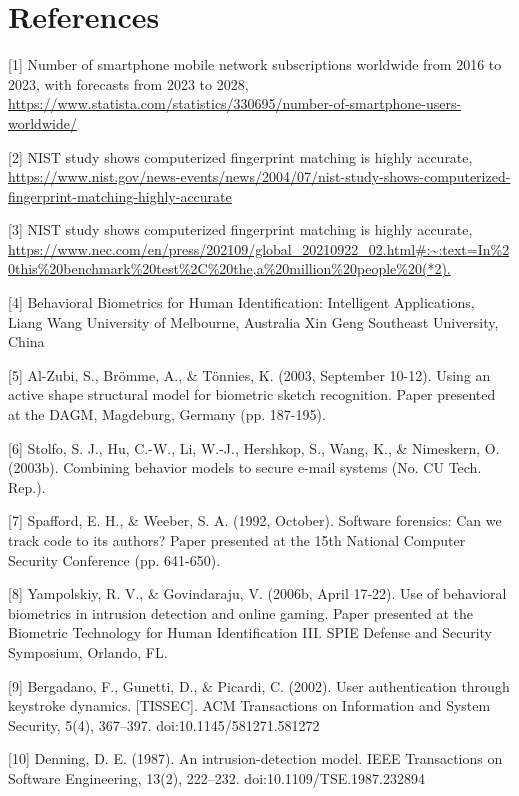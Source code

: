 \documentclass{article}
\begin{document}
\section{References}
\begin{raggedright}

[1] Number of smartphone mobile network subscriptions worldwide from 2016 to 2023, with forecasts from 2023 to 2028, \url{https://www.statista.com/statistics/330695/number-of-smartphone-users-worldwide/}

[2] NIST study shows computerized fingerprint matching is highly accurate, \url{https://www.nist.gov/news-events/news/2004/07/nist-study-shows-computerized-fingerprint-matching-highly-accurate}

[3] NIST study shows computerized fingerprint matching is highly accurate, \url{https://www.nec.com/en/press/202109/global_20210922_02.html#:~:text=In%20this%20benchmark%20test%2C%20the,a%20million%20people%20(*2).}

[4] Behavioral Biometrics for Human Identification: Intelligent Applications, Liang Wang University of Melbourne, Australia Xin Geng Southeast University, China

[5] Al-Zubi, S., Brömme, A., \& Tönnies, K. (2003, September 10-12). Using an active shape structural model for biometric sketch recognition. Paper presented at the DAGM, Magdeburg, Germany (pp. 187-195).

[6] Stolfo, S. J., Hu, C.-W., Li, W.-J., Hershkop, S., Wang, K., \& Nimeskern, O. (2003b). Combining behavior models to secure e-mail systems (No. CU Tech. Rep.). 

[7] Spafford, E. H., \& Weeber, S. A. (1992, October). Software forensics: Can we track code to its authors? Paper presented at the 15th National Computer Security Conference (pp. 641-650).

[8] Yampolskiy, R. V., \& Govindaraju, V. (2006b, April 17-22). Use of behavioral biometrics in intrusion detection and online gaming. Paper presented at the Biometric Technology for Human Identification III. SPIE Defense and Security Symposium, Orlando, FL.

[9] Bergadano, F., Gunetti, D., \& Picardi, C. (2002). User authentication through keystroke dynamics. [TISSEC]. ACM Transactions on Information and System Security, 5(4), 367–397. doi:10.1145/581271.581272

[10] Denning, D. E. (1987). An intrusion-detection model. IEEE Transactions on Software Engineering, 13(2), 222–232. doi:10.1109/TSE.1987.232894


\end{raggedright}
\end{document}
